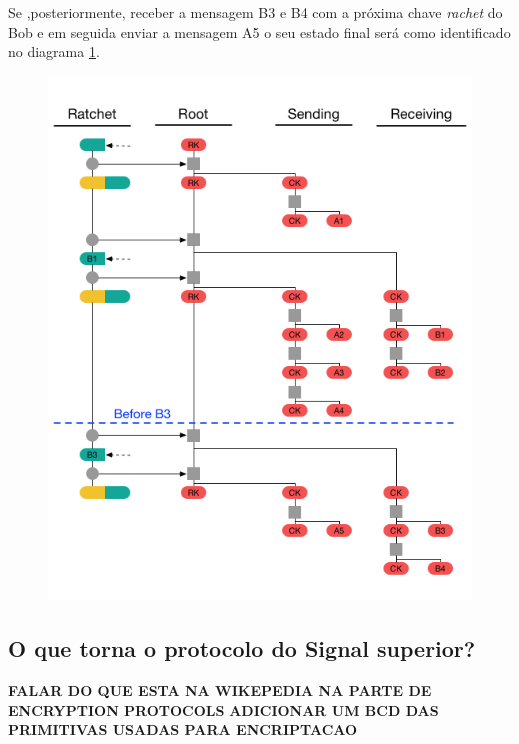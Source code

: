 Se ,posteriormente, receber a mensagem B3 e B4 com a próxima chave \textit{rachet} do Bob e em seguida enviar a mensagem A5 o seu estado final será como identificado no diagrama \ref{diagram:DR5}.

\begin{figure}[H]
\begin{center}
\includegraphics[width=12cm]{img/DR5.png}
\caption{}
\label{diagram:DR5} 
\centering
\end{center}
\end{figure}

\subsection{O que torna o protocolo do Signal superior?}
\textbf{FALAR DO QUE ESTA NA WIKEPEDIA NA PARTE DE ENCRYPTION PROTOCOLS }
\textbf{ADICIONAR UM BCD DAS PRIMITIVAS USADAS PARA ENCRIPTACAO}